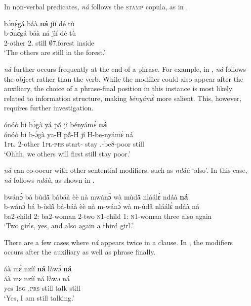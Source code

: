 \noindent In non-verbal predicates, {\itshape ná} follows the \textsc{stamp} copula, as in .

\ea \label{na4}
  \glll  bɔ́nɛ́gá báà {\bfseries ná} jìí dé tù \\
        b-ɔ́nɛ́gá báà ná jìí dé tù \\
          2-other 2.{\COP} still $\emptyset$7.forest {\LOC} inside\\
    \trans `The others are still in the forest.'
\z

{\itshape ná} further occurs frequently at the end of a phrase. For example, in , {\itshape ná} follows the object rather than the verb. While the modifier could also appear after the auxiliary, the choice of a phrase-final position in this instance is most likely related to information structure, making {\itshape bényámɛ̀} more salient. This, however, requires further investigation.

\ea \label{na5}
  \glll  ónóò bí bɔ́gà yá pã́ jî bényámɛ̀ {\bfseries ná} \\
         ónóò bí b-ɔ́gà ya-H pã̂-H jî H-be-nyámɛ̀ ná \\
         {\EXCL} 1\textsc{pl}.{\SBJ} 2-other 1\textsc{pl}-\textsc{prs} start-{\R} stay {\OBJ}.{\LINK}-be8-poor still\\
    \trans `Ohhh, we others will first still stay poor.'
\z

{\itshape ná} can co-oocur with other sentential modifiers, such as {\itshape ndáà} `also'. In this case, {\itshape ná} follows {\itshape ndáà}, as shown in .

\ea \label{na6}
  \glll  bwánɔ̀ bá bùdã̂ bábáà èè nà mwánɔ̀ wà mùdã̂ nláálɛ̀ ndáà {\bfseries ná} \\
         b-wánɔ̀ bá b-ùdã̂ bá-báà èè nà m-wánɔ̀ wà m-ùdã̂ nláálɛ̀ ndáà ná \\
         ba2-child 2:{\ATT} ba2-woman 2-two {\EXCL} {\COM} \textsc{n}1-child 1:{\ATT} \textsc{n}1-woman three also again\\
    \trans `Two girls, yes, and also again a third girl.'
\z


There are a few cases where {\itshape ná} appears twice in a clause. In , the modifiers occurs after the auxiliary as well as phrase finally.

\ea \label{na7}
  \glll     áà mɛ̀ nzíí {\bfseries ná} làwɔ̀ {\bfseries ná} \\
            áà mɛ nzíí ná làwɔ ná \\
              yes 1\textsc{sg} {\PROG}.\textsc{prs} still talk still\\
    \trans `Yes, I am still talking.'
\z


